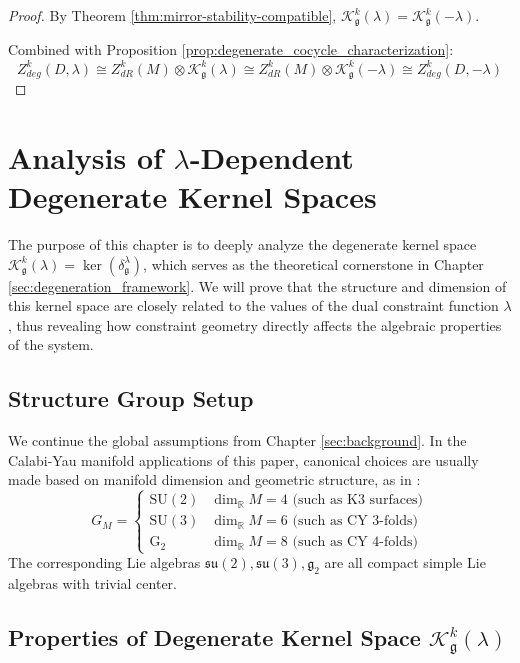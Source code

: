 \documentclass[a4paper,12pt]{extarticle}
\theoremstyle{plain}
\theoremstyle{definition}
\begin{document}
\begin{proof}
By Theorem \ref{thm:mirror-stability-compatible}, $\mathcal{K}_{\mathfrak{g}}^k(\lambda) = \mathcal{K}_{\mathfrak{g}}^k(-\lambda)$.

Combined with Proposition \ref{prop:degenerate_cocycle_characterization}:
$$Z_{deg}^k(D,\lambda) \cong Z^k_{dR}(M) \otimes \mathcal{K}_{\mathfrak{g}}^k(\lambda) \cong Z^k_{dR}(M) \otimes \mathcal{K}_{\mathfrak{g}}^k(-\lambda) \cong Z_{deg}^k(D,-\lambda)$$
\end{proof}

\section{Analysis of $\lambda$-Dependent Degenerate Kernel Spaces}
\label{sec:kernel_analysis}

The purpose of this chapter is to deeply analyze the degenerate kernel space $\mathcal{K}_{\mathfrak{g}}^{k}(\lambda) = \ker(\delta_{\mathfrak{g}}^{\lambda})$, which serves as the theoretical cornerstone in Chapter \ref{sec:degeneration_framework}. We will prove that the structure and dimension of this kernel space are closely related to the values of the dual constraint function $\lambda$, thus revealing how constraint geometry directly affects the algebraic properties of the system.

\subsection{Structure Group Setup}
\label{sec:structure_group_setup}

We continue the global assumptions from Chapter \ref{sec:background}. In the Calabi-Yau manifold applications of this paper, canonical choices are usually made based on manifold dimension and geometric structure, as in \cite{zheng2025spencer-riemann-roch}:
$$G_M = \begin{cases} 
\mathrm{SU}(2) & \dim_{\mathbb{R}} M = 4\text{ (such as K3 surfaces)} \\
\mathrm{SU}(3) & \dim_{\mathbb{R}} M = 6\text{ (such as CY 3-folds)} \\
\mathrm{G}_2 & \dim_{\mathbb{R}} M = 8\text{ (such as CY 4-folds)}
\end{cases}$$
The corresponding Lie algebras $\mathfrak{su}(2), \mathfrak{su}(3), \mathfrak{g}_2$ are all compact simple Lie algebras with trivial center.




\subsection{Properties of Degenerate Kernel Space \texorpdfstring{$\mathcal{K}_{\mathfrak{g}}^{k}(\lambda)$}{K(lambda)}}
\label{sec:kernel_properties}
\end{document}
